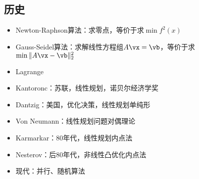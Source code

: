 \documentclass{note}
\begin{document}
\subsection{历史}
\begin{itemize}
\item Newton-Raphson算法：求零点，等价于求$\min f^2(x)$
\item Gauss-Seidel算法：求解线性方程组$A\vx=\vb$，等价于求$\min \|A\vx-\vb\|_2^2$
\item Lagrange
\item Kantoronc：苏联，线性规划，诺贝尔经济学奖
\item Dantzig：美国，优化决策，线性规划单纯形
\item Von Neumann：线性规划问题对偶理论
\item Karmarkar：80年代，线性规划内点法
\item Nesterov：后80年代，非线性凸优化内点法
\item 现代：并行、随机算法
\end{itemize}
\end{document}
